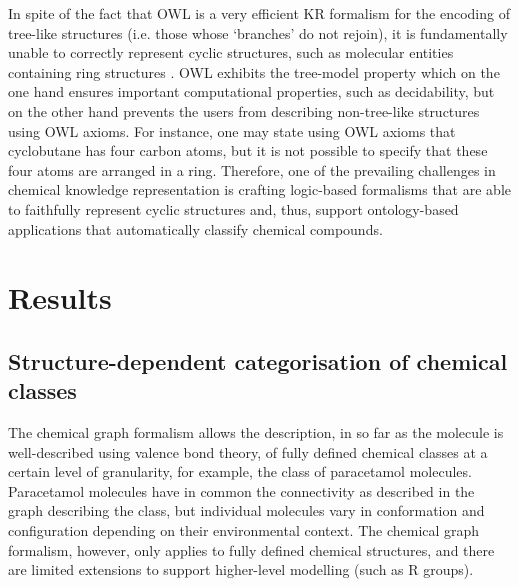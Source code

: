 \documentclass[10pt]{bmc_article}
\newenvironment{bmcformat}{\baselineskip20pt\sloppy\setboolean{publ}{false}}{\baselineskip20pt\sloppy}
\begin{document}
\begin{bmcformat}
In spite of the fact that OWL is a very efficient KR formalism for the encoding of tree-like structures (i.e. those whose `branches' do not rejoin), it is fundamentally unable to correctly represent cyclic structures, such as molecular entities containing ring structures \cite{magka2011}.
OWL exhibits the tree-model property \cite{VardiModalLogic} which on the one hand ensures important computational properties, such as decidability, but on the other hand prevents the users from describing non-tree-like %
structures using OWL axioms. For instance, one may state using OWL axioms that cyclobutane has four carbon atoms, but it is not possible to specify that these four atoms are arranged in a ring. Therefore, one of the prevailing challenges in chemical knowledge representation is crafting logic-based formalisms that are able to faithfully represent cyclic structures and, thus, support ontology-based applications that automatically classify chemical compounds.



\section*{Results}

\subsection*{Structure-dependent categorisation of chemical classes}
\label{sec:resultsclasses}

The chemical graph formalism \cite{trinajstic1992} allows the description, in so far as the molecule is well-described using valence bond theory, of fully defined chemical classes at a certain level of granularity, for example, the class of paracetamol molecules.  Paracetamol molecules have in common the connectivity as described in the graph describing the class, but individual molecules vary in conformation and configuration depending on their environmental context. The chemical graph formalism, however, only applies to fully defined chemical structures, and there are limited extensions to support higher-level modelling (such as R groups). 


\end{bmcformat}
\end{document}

